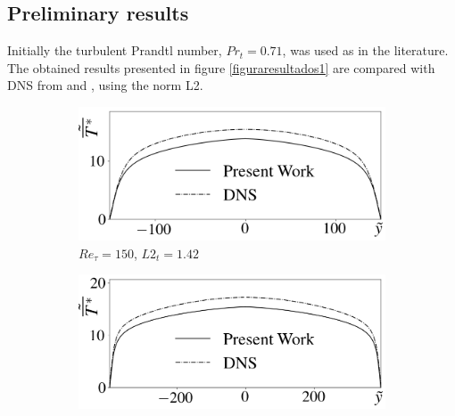 \documentclass[10pt]{article} %
\begin{document}
\subsection{Preliminary results}
Initially the turbulent Prandtl number, $Pr_t = 0.71$, was used as in the literature. The obtained results presented in figure \ref{figuraresultados1} are compared with DNS from \cite{DNS1020} and \cite{DNS150}, using the norm L2.\\
	\begin{figure}[h!] 
		\centering
		\begin{subfigure}[t]{0.49\textwidth}
		\centering
		\includegraphics[angle=0, scale=0.24]{fotos_formatacao_final/Temperature_150_071_classico}
		\caption{$Re_\tau = 150$, $L2_t = 1.42$}
		\end{subfigure}
		\begin{subfigure}[t]{0.49\textwidth}
		\centering
		\includegraphics[angle=0, scale=0.24]{fotos_formatacao_final/Temperature_395_071_classico}

\end{subfigure}
\end{figure}
\end{document}
